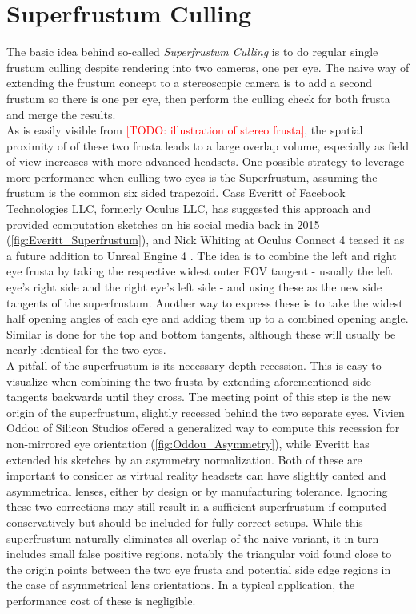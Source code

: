 \section{Superfrustum Culling} \label{SFrust}
The basic idea behind so-called \textit{Superfrustum Culling} is to do regular single frustum culling despite rendering into two cameras, one per eye. The naive way of extending the frustum concept to a stereoscopic camera is to add a second frustum so there is one per eye, then perform the culling check for both frusta and merge the results. \\
As is easily visible from \textcolor{red}{[TODO: illustration of stereo frusta]}, the spatial proximity of of these two frusta leads to a large overlap volume, especially as field of view increases with more advanced headsets. One possible strategy to leverage more performance when culling two eyes is the Superfrustum, assuming the frustum is the common six sided trapezoid. Cass Everitt of Facebook Technologies LLC, formerly Oculus LLC, has suggested this approach and provided computation sketches on his social media back in 2015 \cite{Everitt.2015}(\autoref{fig:Everitt_Superfrustum}), and Nick Whiting at Oculus Connect 4 teased it as a future addition to Unreal Engine 4 \cite{Whiting.2017}. The idea is to combine the left and right eye frusta by taking the respective widest outer FOV tangent - usually the left eye's right side and the right eye's left side - and using these as the new side tangents of the superfrustum. Another way to express these is to take the widest half opening angles of each eye and adding them up to a combined opening angle. Similar is done for the top and bottom tangents, although these will usually be nearly identical for the two eyes. \\
A pitfall of the superfrustum is its necessary depth recession. This is easy to visualize when combining the two frusta by extending aforementioned side tangents backwards until they cross. The meeting point of this step is the new origin of the superfrustum, slightly recessed behind the two separate eyes. 
Vivien Oddou of Silicon Studios offered a generalized way to compute this recession for non-mirrored eye orientation \cite{Oddou.23.05.2017}(\autoref{fig:Oddou_Asymmetry}), while Everitt has extended his sketches by an asymmetry normalization\cite{Everitt.2015b}. Both of these are important to consider as virtual reality headsets can have slightly canted and asymmetrical lenses, either by design or by manufacturing tolerance. Ignoring these two corrections may still result in a sufficient superfrustum if computed conservatively but should be included for fully correct setups. 
While this superfrustum naturally eliminates all overlap of the naive variant, it in turn includes small false positive regions, notably the triangular void found close to the origin points between the two eye frusta and potential side edge regions in the case of asymmetrical lens orientations. In a typical application, the performance cost of these is negligible. \\

